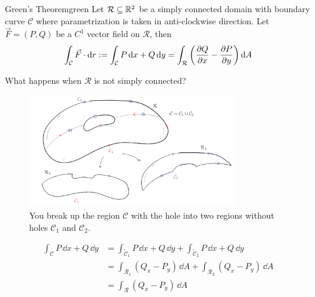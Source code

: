 \documentclass[../Analysis-3.tex]{subfiles}
\begin{document}
\begin{Thm}{Green's Theorem}{green}
  Let $\mathcal{R} \subseteq \mathbb{R}^2 $ be a simply connected domain with boundary curve $\mathcal{C}$ where parametrization is taken in anti-clockwise direction. Let $\vec{F} = (P,Q)$ be a $C^1$ vector field on $\mathcal{R}$, then
  \[
    \int_{\mathcal{C}} \vec{F} \cdot \dd r := \int_{\mathcal{C}} P \, \dd x + Q \, \dd y = \int_{\mathcal{R}} \left( \pdv{Q}{x} - \pdv{P}{y}\right) \dd A
  \]
\end{Thm}

What happens when $\mathcal{R}$ is not simply connected?
\begin{figure}[H]
  \centering
  \includegraphics[width=0.8\textwidth]{../figures/lec27.5.png}
  \caption{You break up the region $\mathcal{C}$ with the hole into two regions without holes $\mathcal{C}_1$ and $\mathcal{C}_2$.}
  \label{fig5:27}
\end{figure}
\begin{align*}
  \int_{\mathcal{C}} P \, \dd x + Q \, \dd y
   & = \int_{\tilde{\mathcal{C}}_1} P \, \dd x + Q \, \dd y + \int_{\tilde{\mathcal{C}}_2} P \, \dd x + Q \, \dd y \\
   & = \int_{\mathcal{R}_1} (Q_x - P_y) \, \dd A + \int_{\mathcal{R}_2} (Q_x - P_y) \, \dd A                       \\
   & = \int_{\mathcal{R}} (Q_x - P_y) \, \dd A
\end{align*}
\end{document}
